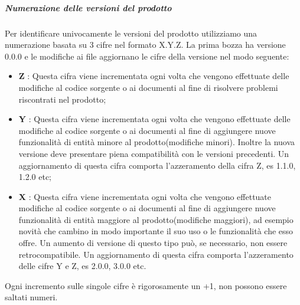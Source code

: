 		\subparagraph*{Numerazione delle versioni del prodotto}
		Per identificare univocamente le versioni del prodotto utilizziamo una numerazione basata su 3 cifre nel formato X.Y.Z. La prima bozza ha versione 0.0.0 e le modifiche ai file aggiornano le cifre della versione nel modo seguente:
		\begin{itemize}
			\item \textbf{Z} : Questa cifra viene incrementata ogni volta che vengono effettuate delle modifiche al codice sorgente o ai documenti al fine di risolvere problemi riscontrati nel prodotto\glo;
			\item \textbf{Y} : Questa cifra viene incrementata ogni volta che vengono effettuate delle modifiche al codice sorgente o ai documenti al fine di aggiungere nuove funzionalità di entità minore al prodotto\glo(modifiche minori\glo). Inoltre la nuova versione deve presentare piena compatibilità con le versioni precedenti. Un aggiornamento di questa cifra comporta l'azzeramento della cifra Z, es 1.1.0, 1.2.0 etc;
			\item \textbf{X} : Questa cifra viene incrementata ogni volta che vengono effettuate modifiche al codice sorgente o ai documenti al fine di aggiungere nuove funzionalità di entità maggiore al prodotto\glo(modifiche maggiori\glo), ad esempio novità che cambino in modo importante il suo uso o le funzionalità che esso offre. Un aumento di versione di questo tipo può, se necessario, non essere retrocompatibile. Un aggiornamento di questa cifra comporta l'azzeramento delle cifre Y e Z, es 2.0.0, 3.0.0 etc.
		\end{itemize}
		Ogni incremento sulle singole cifre è rigorosamente un +1, non possono essere saltati numeri.
		
